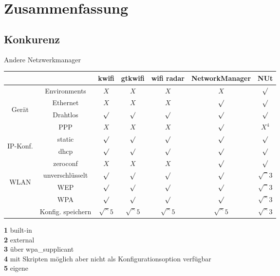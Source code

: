 
\section{Zusammenfassung}
\subsection{Konkurenz}
\begin{frame}[<+-| alert@+>]{Andere Netzwerkmanager}
	\fontsize{7}{8.4}\selectfont
	\begin{center}
	\begin{tabular}{cc|c|c|c|c|c}
		&					& kwifi		& gtkwifi	& wifi radar	& NetworkManager	& NUt \\
		\hline
		&Environments		& $X$			& $X$			& $X$			& $X$				& $\surd$ \\
		\hline
		\multirow{3}{*}{\begin{sideways} Gerät \end{sideways}}
		& Ethernet			& $X$			& $X$			& $X$			& $\surd$			& $\surd$ \\
		\cline{2-7}
		& Drahtlos			& $\surd$		& $\surd$		& $\surd$		& $\surd$			& $\surd$ \\
		\cline{2-7}
		& PPP				& $X$			& $X$			& $X$			& $\surd$			& $X^{4}$ \\
		\hline
		\multirow{3}{*}{\begin{sideways} IP-Konf. \end{sideways}}
		&static				& $\surd$		& $\surd$		& $\surd$		& $\surd$			& $\surd$ \\
		\cline{2-7}
		& dhcp				& $\surd$		& $\surd$		& $\surd$		& $\surd$			& $\surd$ \\
		\cline{2-7}
		& zeroconf			& $X$			& $X$			& $X$			& $\surd$			& $\surd$ \\
		\hline
		\multirow{4}{*}{\begin{sideways} WLAN \end{sideways}}
		&unverschlüsselt	& $\surd$		& $\surd$		& $\surd$		& $\surd$			& $\surd^{3}$ \\
		\cline{2-7}
		&WEP				& $\surd$		& $\surd$		& $\surd$		& $\surd$			& $\surd^{3}$ \\
		\cline{2-7}
		&WPA				& $\surd$		& $\surd$		& $\surd$		& $\surd$			& $\surd^{3}$ \\
		\cline{2-7}
		&Konfig. speichern	& $\surd^{5}$	& $\surd^{5}$	& $\surd^{5}$	& $\surd^{5}$		& $\surd^{3}$
	\end{tabular}
	\end{center}
	\textbf{1} built-in\\
	\textbf{2} external\\
	\textbf{3} über wpa\_supplicant\\
	\textbf{4} mit Skripten möglich aber nicht als Konfigurationsoption verfügbar\\
	\textbf{5} eigene \\
\end{frame}

